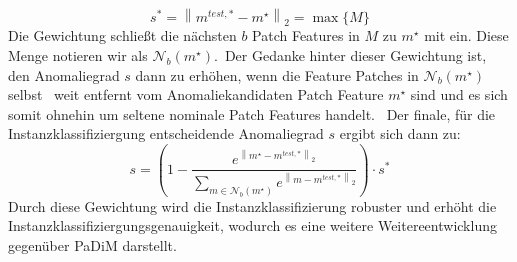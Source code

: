 $$
s^{*}=\left\|m^{test,*}-m^{\star}\right\|_{2}=\max\{M\}
$$
Die Gewichtung schließt die nächsten $b$ Patch Features in $M$ zu $m^{\star}$ mit ein. Diese Menge notieren wir als $\mathcal{N}_{b}\left(m^{\star}\right)$.\
Der Gedanke hinter dieser Gewichtung ist, den Anomaliegrad $s$ dann zu erhöhen, wenn die Feature Patches in $\mathcal{N}_{b}\left(m^{\star}\right)$ selbst \
weit entfernt vom Anomaliekandidaten Patch Feature $m^{\star}$ sind und es sich somit ohnehin um seltene nominale Patch Features handelt. \
Der finale, für die Instanzklassifiziergung entscheidende Anomaliegrad $s$ ergibt sich dann zu:\
$$
s = \left(1-\frac{e^{\left\|m^{\star}-m^{test,*}\right\|_{2}}}{\sum\nolimits_{m\in\mathcal{N}_{b}\left(m^{\star}\right)}e^{\left\|m-m^{test,*}\right\|_{2}}}\right) \cdot s^{*}
$$
Durch diese Gewichtung wird die Instanzklassifizierung robuster und erhöht die Instanzklassifiziergungsgenauigkeit, wodurch es eine weitere Weitereentwicklung gegenüber PaDiM darstellt.\
